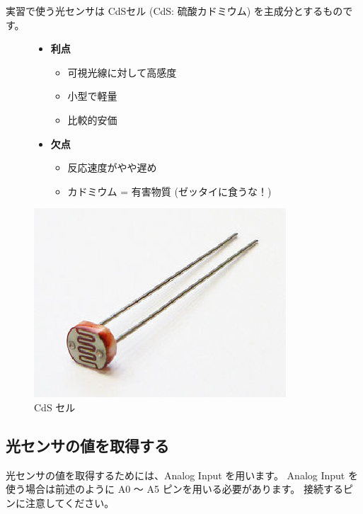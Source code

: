 \documentclass[11pt,a4paper]{jarticle}
\begin{document}
実習で使う光センサは CdSセル (CdS: 硫酸カドミウム) を主成分とするものです。

\begin{figure}[h!]
 \begin{minipage}{0.666\columnwidth}
  \begin{itemize}
   \item \textbf{利点}
	 \begin{itemize}
	  \item 可視光線に対して高感度
	  \item 小型で軽量
	  \item 比較的安価
	 \end{itemize}
   \item \textbf{欠点}
	 \begin{itemize}
	  \item 反応速度がやや遅め
	  \item カドミウム = 有害物質 (ゼッタイに食うな！)
	 \end{itemize}
  \end{itemize}
 \end{minipage}
 \begin{minipage}{0.333\columnwidth}
  \centering
  \includegraphics[width=\columnwidth]{img/cds_cell.eps}
  \caption{CdS セル}
 \end{minipage}
\end{figure}


\subsection*{光センサの値を取得する}
光センサの値を取得するためには、Analog Input を用います。
Analog Input を使う場合は前述のように A0 〜 A5 ピンを用いる必要があります。
接続するピンに注意してください。
\end{document}
